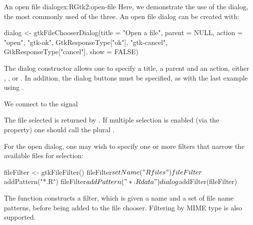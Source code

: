 \begin{example}{An open file dialog}{ex:RGtk2:open-file}
  Here, we demonstrate the use of the dialog, the most commonly used
  of the three.  An open file dialog can be created with:
\begin{Schunk}
\begin{Sinput}
 dialog <- gtkFileChooserDialog(title = "Open a file", 
                      parent = NULL, action = "open",
                      "gtk-ok", GtkResponseType["ok"],
                      "gtk-cancel", GtkResponseType["cancel"],
                      show = FALSE)
\end{Sinput}
\end{Schunk}
  The dialog constructor allows one to specify a title, a parent and an
  action, either , ,  or
  . In addition, the dialog buttons must be
  specified, as with the last example using
  .

  We connect to the  signal
\begin{Schunk}
\end{Schunk}
  The file selected is returned by
  . If multiple selection is enabled
  (via the  property) one should call the
  plural .

  For the open dialog, one may wish to specify one or more filters that
  narrow the available files for selection:
\begin{Schunk}
\begin{Sinput}
 fileFilter <- gtkFileFilter()
 fileFilter$setName("R files")
 fileFilter$addPattern("*.R")
 fileFilter$addPattern("*.Rdata")
 dialog$addFilter(fileFilter)
\end{Sinput}
\end{Schunk}
  The  function constructs a filter, which is
  given a name and a set of file name patterns, before being added to
  the file chooser. Filtering by MIME type is also supported.

\end{example}

